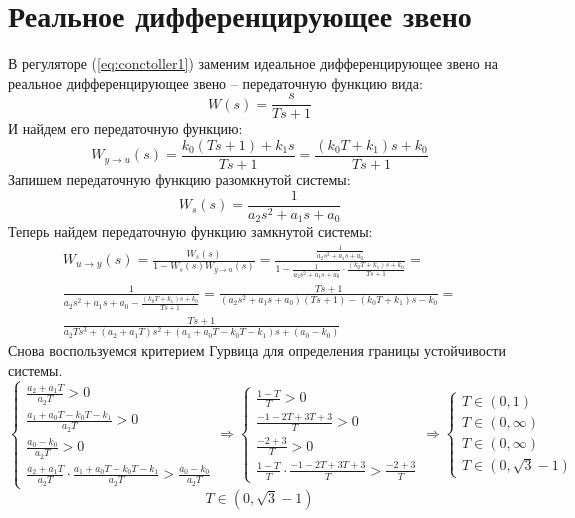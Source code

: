 \section{Реальное дифференцирующее звено}
В регуляторе (\ref{eq:conctoller1}) заменим идеальное дифференцирующее звено на реальное дифференцирующее звено -- 
передаточную функцию вида: 
\begin{equation}
    W(s) = \frac{s}{Ts + 1}
\end{equation}
И найдем его передаточную функцию:
\begin{equation}
    W_{y\rightarrow u}(s) = \frac{k_0(Ts + 1) + k_1s}{Ts + 1} = \frac{(k_0T + k_1)s + k_0}{Ts + 1}
\end{equation}
Запишем передаточную функцию разомкнутой системы:
\begin{equation}
    W_{s}(s) = \frac{1}{a_2s^2 + a_1s + a_0} 
\end{equation}
Теперь найдем передаточную функцию замкнутой системы:
\begin{multline}
    W_{u\rightarrow y}(s) = \frac{W_s(s)}{1 - W_s(s)W_{y\rightarrow u}(s)} = \frac{\frac{1}{a_2s^2 + a_1s + a_0} }{1 - \frac{1}{a_2s^2 + a_1s + a_0} \cdot \frac{(k_0T + k_1)s + k_0}{Ts + 1}} = \\
    \frac{1}{a_2s^2 + a_1s + a_0 - \frac{(k_0T + k_1)s + k_0}{Ts + 1}} = \frac{Ts + 1}{(a_2s^2 + a_1s + a_0)(Ts + 1) - (k_0T + k_1)s - k_0} = \\
    \frac{Ts + 1}{a_2Ts^3 + (a_2 + a_1T)s^2 + (a_1 + a_0T - k_0T - k_1)s + (a_0 - k_0)}
\end{multline}
Снова воспользуемся критерием Гурвица для определения границы устойчивости системы.
\begin{equation}
    \begin{cases}
        \frac{a_2 + a_1T}{a_2T} > 0 \\
        \frac{a_1 + a_0T - k_0T - k_1}{a_2T} > 0 \\
        \frac{a_0 - k_0}{a_2T} > 0 \\
        \frac{a_2 + a_1T}{a_2T}\cdot\frac{a_1 + a_0T - k_0T - k_1}{a_2T} > \frac{a_0 - k_0}{a_2T}
    \end{cases} \Rightarrow 
    \begin{cases}
        \frac{1 -T}{T} > 0 \\
        \frac{-1 -2T +3T +3}{T} > 0 \\
        \frac{-2 +3}{T} > 0 \\
        \frac{1 -T}{T}\cdot\frac{-1 -2T +3T +3}{T} > \frac{-2 +3}{T}
    \end{cases} \Rightarrow
    \begin{cases}
        T \in (0, 1) \\
        T \in (0, \infty) \\
        T \in (0, \infty) \\
        T \in (0, \sqrt{3} - 1)
    \end{cases}
\end{equation}
\begin{equation}
    T \in (0, \sqrt{3} - 1)
\end{equation}

